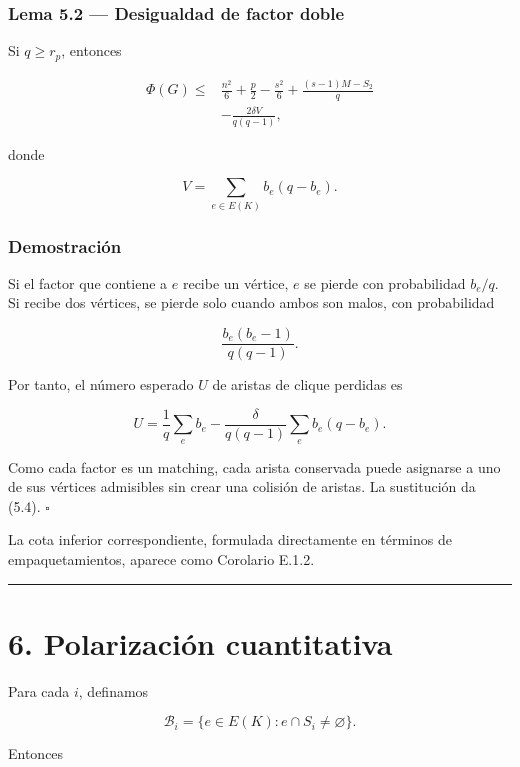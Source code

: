\documentclass[
  spanish,
  11pt,
  a4paper,
]{article}
\begin{document}
\subsubsection{Lema 5.2 --- Desigualdad de factor doble}\label{lema-5.2-desigualdad-de-factor-doble}

Si \(q\ge r_p\), entonces

\[
\boxed{
\begin{aligned}
\Phi(G)
\le{}&
\frac{n^2}{6}+\frac p2-\frac{s^2}{6}
+
\frac{(s-1)M-S_2}{q}\\
&-
\frac{2\delta V}{q(q-1)},
\end{aligned}
}
\tag{5.4}
\]

donde

\[
V=\sum_{e\in E(K)}b_e(q-b_e).
\tag{5.5}
\]

\subsubsection{Demostración}\label{demostraciuxf3n-4}

Si el factor que contiene a \(e\) recibe un vértice, \(e\) se pierde con probabilidad \(b_e/q\). Si recibe dos vértices, se pierde solo cuando ambos son malos, con probabilidad

\[
\frac{b_e(b_e-1)}{q(q-1)}.
\]

Por tanto, el número esperado \(U\) de aristas de clique perdidas es

\[
U
=
\frac1q\sum_e b_e
-
\frac{\delta}{q(q-1)}\sum_e b_e(q-b_e).
\]

Como cada factor es un matching, cada arista conservada puede asignarse a uno de sus vértices admisibles sin crear una colisión de aristas. La sustitución da (5.4). \(\square\)

La cota inferior correspondiente, formulada directamente en términos de empaquetamientos, aparece como Corolario E.1.2.

\begin{center}\rule{0.5\linewidth}{0.5pt}\end{center}

\section{6. Polarización cuantitativa}\label{polarizaciuxf3n-cuantitativa}

Para cada \(i\), definamos

\[
\mathcal B_i=\{e\in E(K):e\cap S_i\ne\varnothing\}.
\]

Entonces
\end{document}
